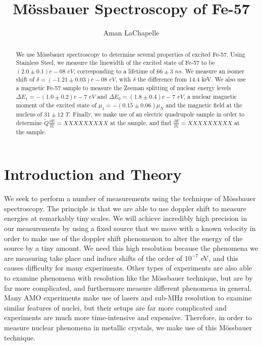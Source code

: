 \documentclass[reprint, nobibnotes, amssymb, amsmath, amsfonts, mathtools, mathrsfs, floatfix]{revtex4-1}
\newcommand{\moss}{M\"{o}ssbauer }
\begin{document}
  \title{\moss Spectroscopy of Fe-57}

  \author{Aman LaChapelle}

  \begin{abstract}
    We use \moss spectroscopy to determine several properties of excited Fe-57.  Using Stainless Steel, we measure the linewidth of the excited state of Fe-57 to be $(2.0\pm0.1)e-08\,\, eV$, corresponding to a lifetime of $66 \pm 3\,\, ns$.  We measure an isomer shift of $\delta = (-1.21\pm0.03)e-08\,\, eV$, with $\delta$ the difference from 14.4 keV.  We also use a magnetic Fe-57 sample to measure the Zeeman splitting of nuclear energy levels $\Delta E_1 = -(1.0\pm0.2)e-7\,\, eV$ and $\Delta E_0 = (1.8\pm0.4)e-7\,\, eV$, a nuclear magnetic moment of the excited state of $\mu_1 = -(0.15\pm0.06)\mu_N$ and the magnetic field at the nucleus of $31\pm12\,\, T$.  Finally, we make use of an electric quadrupole sample in order to determine $\tilde{Q}\frac{\partial E}{\partial z} = XXXXXXXXX$ at the sample, and find $\frac{\partial E}{\partial z} = XXXXXXXXX$ at the sample.
  \end{abstract}

  \maketitle
  \tableofcontents

  \section{Introduction and Theory}
    We seek to perform a number of measurements using the technique of \moss spectroscopy.  The principle is that we are able to use doppler shift to measure energies at remarkably tiny scales.  We will achieve incredibly high precision in our measurements by using a fixed source that we move with a known velocity in order to make use of the doppler shift phenomenon to alter the energy of the source by a tiny amount.  We need this high resolution because the phenomena we are measuring take place and induce shifts of the order of $10^{-7}$ eV, and this causes difficulty for many experiments.  Other types of experiments are also able to examine phenomena with resolution like the \moss technique, but are by far more complicated, and furthermore measure different phenomena in general.  Many AMO experiments make use of lasers and sub-MHz resolution to examine similar features of nuclei, but their setups are far more complicated and experiments are much more time-intensive and expensive.  Therefore, in order to measure nuclear phenomena in metallic crystals, we make use of this \moss technique.
\end{document}
